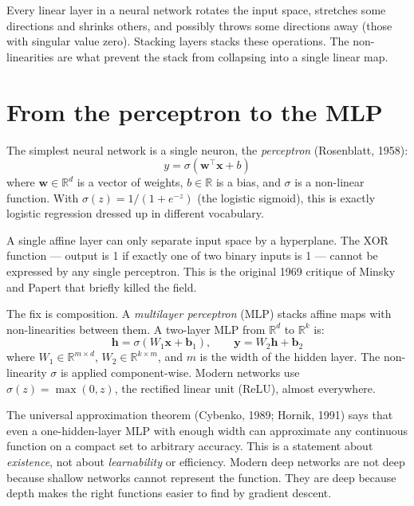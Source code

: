 \begin{intuition}
Every linear layer in a neural network rotates the input space, stretches some directions and shrinks others, and possibly throws some directions away (those with singular value zero). Stacking layers stacks these operations. The non-linearities are what prevent the stack from collapsing into a single linear map.
\end{intuition}

\section{From the perceptron to the MLP}

The simplest neural network is a single neuron, the \emph{perceptron} (Rosenblatt, 1958):
\[
y = \sigma(\bm{w}^\top \bm{x} + b)
\]
where $\bm{w} \in \mathbb{R}^d$ is a vector of weights, $b \in \mathbb{R}$ is a bias, and $\sigma$ is a non-linear function. With $\sigma(z) = 1/(1 + e^{-z})$ (the logistic sigmoid), this is exactly logistic regression dressed up in different vocabulary.

\begin{proposition}
A single affine layer can only separate input space by a hyperplane. The XOR function --- output is 1 if exactly one of two binary inputs is 1 --- cannot be expressed by any single perceptron. This is the original 1969 critique of Minsky and Papert that briefly killed the field.
\end{proposition}

The fix is composition. A \emph{multilayer perceptron} (MLP) stacks affine maps with non-linearities between them. A two-layer MLP from $\mathbb{R}^d$ to $\mathbb{R}^k$ is:
\[
\bm{h} = \sigma(W_1 \bm{x} + \bm{b}_1), \qquad \bm{y} = W_2 \bm{h} + \bm{b}_2
\]
where $W_1 \in \mathbb{R}^{m \times d}$, $W_2 \in \mathbb{R}^{k \times m}$, and $m$ is the width of the hidden layer. The non-linearity $\sigma$ is applied component-wise. Modern networks use $\sigma(z) = \max(0, z)$, the rectified linear unit (ReLU), almost everywhere.

\begin{aitip}
The universal approximation theorem (Cybenko, 1989; Hornik, 1991) says that even a one-hidden-layer MLP with enough width can approximate any continuous function on a compact set to arbitrary accuracy. This is a statement about \emph{existence}, not about \emph{learnability} or efficiency. Modern deep networks are not deep because shallow networks cannot represent the function. They are deep because depth makes the right functions easier to find by gradient descent.
\end{aitip}


